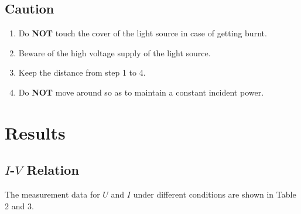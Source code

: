 \documentclass{article}
\begin{document}
{\subsection*{Caution}
\begin{enumerate}
    \item Do \textbf{NOT} touch the cover of the light source in case of getting burnt.
    \item Beware of the high voltage supply of the light source.
    \item Keep the distance from step 1 to 4.
    \item Do \textbf{NOT} move around so as to maintain a constant incident power.
\end{enumerate}

\section{Results}

\subsection{$I$-$V$ Relation}

The measurement data for $U$ and $I$ under different conditions are shown in Table 2 and 3.

}
\end{document}
